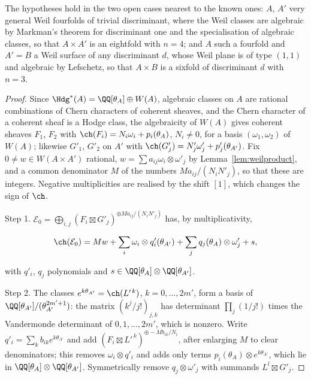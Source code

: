 The hypotheses hold in the two open cases nearest to the known ones: $A$, $A'$ very general Weil fourfolds of trivial discriminant, where the Weil classes are algebraic by Markman's theorem for discriminant one \cite{Mar23} and the specialisation of algebraic classes, so that $A\times A'$ is an eightfold with $n=4$; and $A$ such a fourfold and $A'=B$ a Weil surface of any discriminant $d$, whose Weil plane is of type $(1,1)$ and algebraic by Lefschetz, so that $A\times B$ is a sixfold of discriminant $d$ with $n=3$.

\begin{proof}
Since $\Hdg^{*}(A)=\QQ[\theta_{A}]\oplus W(A)$, algebraic classes on $A$ are rational combinations of Chern characters of coherent sheaves, and the Chern character of a coherent sheaf is a Hodge class, the algebraicity of $W(A)$ gives coherent sheaves $F_{1}$, $F_{2}$ with $\ch(F_{i})=N_{i}\omega_{i}+p_{i}(\theta_{A})$, $N_{i}\ne0$, for a basis $(\omega_{1},\omega_{2})$ of $W(A)$; likewise $G'_{1}$, $G'_{2}$ on $A'$ with $\ch(G'_{j})=N'_{j}\omega'_{j}+p'_{j}(\theta_{A'})$. Fix $0\ne w\in W(A\times A')$ rational, $w=\sum a_{ij}\omega_{i}\otimes\omega'_{j}$ by Lemma~\ref{lem:weilproduct}, and a common denominator $M$ of the numbers $Ma_{ij}/(N_{i}N'_{j})$, so that these are integers. Negative multiplicities are realised by the shift $[1]$, which changes the sign of $\ch$.

Step 1. $\mathcal{E}_{0}=\bigoplus_{i,j}(F_{i}\boxtimes G'_{j})^{\oplus Ma_{ij}/(N_{i}N'_{j})}$ has, by multiplicativity,
\begin{widetext}
\begin{equation}\label{eq:chE0}
\ch(\mathcal{E}_{0})=Mw+\sum_{i}\omega_{i}\otimes q'_{i}(\theta_{A'})+\sum_{j}q_{j}(\theta_{A})\otimes\omega'_{j}+s,
\end{equation}
\end{widetext}
with $q'_{i}$, $q_{j}$ polynomials and $s\in\QQ[\theta_{A}]\otimes\QQ[\theta_{A'}]$.

Step 2. The classes $e^{k\theta_{A'}}=\ch(L'^{\,k})$, $k=0,\dots,2m'$, form a basis of $\QQ[\theta_{A'}]/(\theta_{A'}^{2m'+1})$: the matrix $(k^{j}/j!)_{j,k}$ has determinant $\prod_{j}(1/j!)$ times the Vandermonde determinant of $0,1,\dots,2m'$, which is nonzero. Write $q'_{i}=\sum_{k}b_{ik}e^{k\theta_{A'}}$ and add $(F_{i}\boxtimes L'^{\,k})^{\oplus-Mb_{ik}/N_{i}}$, after enlarging $M$ to clear denominators; this removes $\omega_{i}\otimes q'_{i}$ and adds only terms $p_{i}(\theta_{A})\otimes e^{k\theta_{A'}}$, which lie in $\QQ[\theta_{A}]\otimes\QQ[\theta_{A'}]$. Symmetrically remove $q_{j}\otimes\omega'_{j}$ with summands $L^{l}\boxtimes G'_{j}$.


\end{proof}
